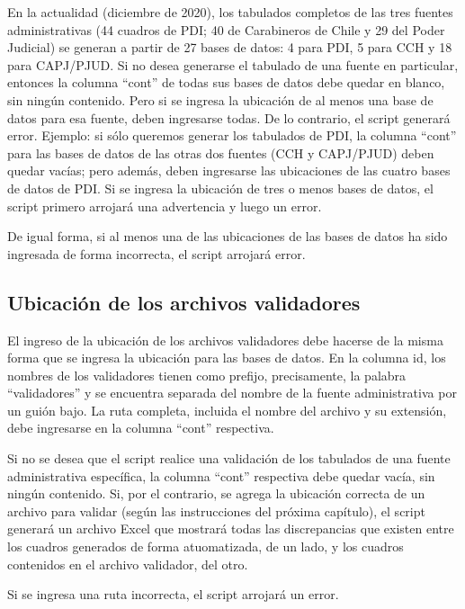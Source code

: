 \documentclass[
  spanish,
]{book}
\begin{document}
En la actualidad (diciembre de 2020), los tabulados completos de las tres fuentes administrativas (44 cuadros de PDI; 40 de Carabineros de Chile y 29 del Poder Judicial) se generan a partir de 27 bases de datos: 4 para PDI, 5 para CCH y 18 para CAPJ/PJUD. Si no desea generarse el tabulado de una fuente en particular, entonces la columna ``cont'' de todas sus bases de datos debe quedar en blanco, sin ningún contenido. Pero si se ingresa la ubicación de al menos una base de datos para esa fuente, deben ingresarse todas. De lo contrario, el script generará error. Ejemplo: si sólo queremos generar los tabulados de PDI, la columna ``cont'' para las bases de datos de las otras dos fuentes (CCH y CAPJ/PJUD) deben quedar vacías; pero además, deben ingresarse las ubicaciones de las cuatro bases de datos de PDI. Si se ingresa la ubicación de tres o menos bases de datos, el script primero arrojará una advertencia y luego un error.

De igual forma, si al menos una de las ubicaciones de las bases de datos ha sido ingresada de forma incorrecta, el script arrojará error.

\hypertarget{ubicaciuxf3n-de-los-archivos-validadores}{%
\subsection{Ubicación de los archivos validadores}\label{ubicaciuxf3n-de-los-archivos-validadores}}

El ingreso de la ubicación de los archivos validadores debe hacerse de la misma forma que se ingresa la ubicación para las bases de datos. En la columna id, los nombres de los validadores tienen como prefijo, precisamente, la palabra ``validadores'' y se encuentra separada del nombre de la fuente administrativa por un guión bajo. La ruta completa, incluida el nombre del archivo y su extensión, debe ingresarse en la columna ``cont'' respectiva.

Si no se desea que el script realice una validación de los tabulados de una fuente administrativa específica, la columna ``cont'' respectiva debe quedar vacía, sin ningún contenido. Si, por el contrario, se agrega la ubicación correcta de un archivo para validar (según las instrucciones del próxima capítulo), el script generará un archivo Excel que mostrará todas las discrepancias que existen entre los cuadros generados de forma atuomatizada, de un lado, y los cuadros contenidos en el archivo validador, del otro.

Si se ingresa una ruta incorrecta, el script arrojará un error.
\end{document}
